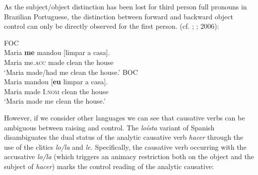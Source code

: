 \documentclass[output=paper]{langsci/langscibook}
\begin{document}
As the subject/object distinction has been lost for third person full pronouns in Brazilian Portuguese, the distinction between forward and backward object control can only be directly observed for the first person. (cf. \citealt{Farrell1995}; \citealt{Boeckx2004}; 2006):

\ea%
    \label{ex:moreno:5}
    \z
\z    



\ea%
    \label{ex:moreno:6}
    \ea  FOC\\
    \gll Maria  \textbf{me}        mandou  [limpar a    casa].      \\
         Maria  me.\textsc{acc} made       clean   the house\\
    \glt ‘Maria made/had me clean the house.’
    \ex  BOC \\
    \gll Maria mandou [\textbf{eu}        limpar a   casa].      \\
         Maria made       I.\textsc{nom}  clean  the house\\
    \glt ‘Maria made me clean the house.’
    \z
\z    

However, if we consider other languages we can see that causative verbs can be ambiguous between raising and control. The \textit{loísta} variant of Spanish disambiguates the dual status of the analytic causative verb \textit{hacer} through the use of the clitics \textit{lo/la} and \textit{le.} Specifically, the causative verb occurring with the accusative \textit{lo/la} (which triggers an animacy restriction both on the object and the subject of \textit{hacer}) marks the control reading of the analytic causative:

\ea%
    \label{ex:moreno:7}
    \z
\z
\end{document}
